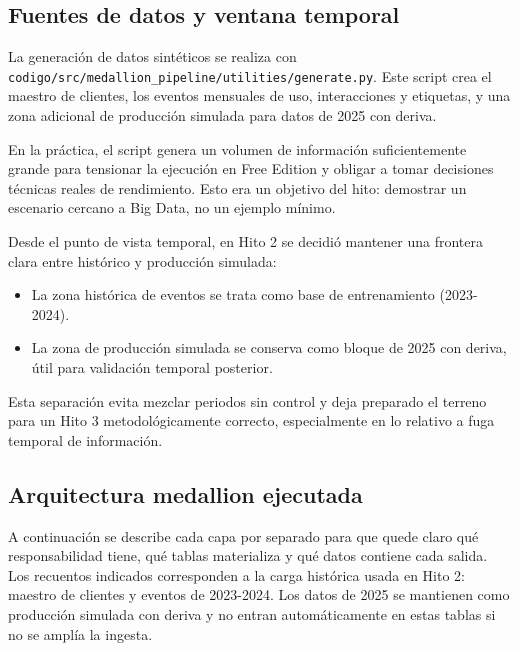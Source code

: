 \documentclass[12pt,a4paper]{article}
\begin{document}
\subsection{Fuentes de datos y ventana temporal}

La generación de datos sintéticos se realiza con \nolinkurl{codigo/src/medallion_pipeline/utilities/generate.py}. Este script crea el maestro de clientes, los eventos mensuales de uso, interacciones y etiquetas, y una zona adicional de producción simulada para datos de 2025 con deriva.\par

En la práctica, el script genera un volumen de información suficientemente grande para tensionar la ejecución en Free Edition y obligar a tomar decisiones técnicas reales de rendimiento. Esto era un objetivo del hito: demostrar un escenario cercano a Big Data, no un ejemplo mínimo.\par

Desde el punto de vista temporal, en Hito 2 se decidió mantener una frontera clara entre histórico y producción simulada:\par

\begin{itemize}
\item La zona histórica de eventos se trata como base de entrenamiento (2023-2024).
\item La zona de producción simulada se conserva como bloque de 2025 con deriva, útil para validación temporal posterior.
\end{itemize}

Esta separación evita mezclar periodos sin control y deja preparado el terreno para un Hito 3 metodológicamente correcto, especialmente en lo relativo a fuga temporal de información.\par

\subsection{Arquitectura medallion ejecutada}

A continuación se describe cada capa por separado para que quede claro qué responsabilidad tiene, qué tablas materializa y qué datos contiene cada salida. Los recuentos indicados corresponden a la carga histórica usada en Hito 2: maestro de clientes y eventos de 2023-2024. Los datos de 2025 se mantienen como producción simulada con deriva y no entran automáticamente en estas tablas si no se amplía la ingesta.\par
\end{document}
